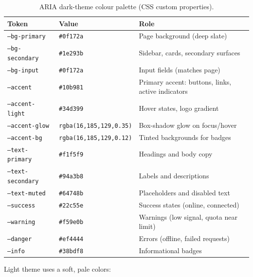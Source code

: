 \begin{table}[H]
\centering
\caption{ARIA dark-theme colour palette (CSS custom properties).}
\label{tab:palette-dark}
\small
\renewcommand{\arraystretch}{1.4}
\begin{tabular}{@{}llp{6.8cm}@{}}
\toprule
\textbf{Token} & \textbf{Value} & \textbf{Role} \\
\midrule
\texttt{--bg-primary}     & \texttt{\#0f172a} & Page background (deep slate) \\
\texttt{--bg-secondary}   & \texttt{\#1e293b} & Sidebar, cards, secondary surfaces \\
\texttt{--bg-input}       & \texttt{\#0f172a} & Input fields (matches page) \\
\texttt{--accent}         & \texttt{\#10b981} & Primary accent: buttons, links, active indicators \\
\texttt{--accent-light}   & \texttt{\#34d399} & Hover states, logo gradient \\
\texttt{--accent-glow}    & \texttt{rgba(16,185,129,0.35)} & Box-shadow glow on focus/hover \\
\texttt{--accent-bg}      & \texttt{rgba(16,185,129,0.12)} & Tinted backgrounds for badges \\
\texttt{--text-primary}   & \texttt{\#f1f5f9} & Headings and body copy \\
\texttt{--text-secondary} & \texttt{\#94a3b8} & Labels and descriptions \\
\texttt{--text-muted}     & \texttt{\#64748b} & Placeholders and disabled text \\
\texttt{--success}        & \texttt{\#22c55e} & Success states (online, connected) \\
\texttt{--warning}        & \texttt{\#f59e0b} & Warnings (low signal, quota near limit) \\
\texttt{--danger}         & \texttt{\#ef4444} & Errors (offline, failed requests) \\
\texttt{--info}           & \texttt{\#38bdf8} & Informational badges \\
\bottomrule
\end{tabular}
\end{table}


Light theme uses a soft, pale colors:

